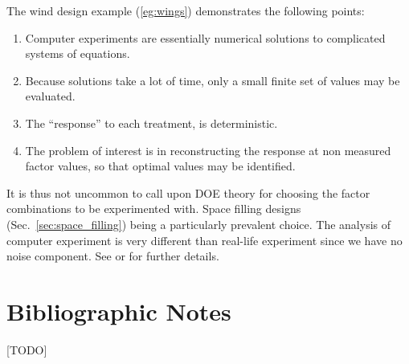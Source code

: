 The wind design example (\ref{eg:wings}) demonstrates the following points:
\begin{enumerate}
\item Computer experiments are essentially numerical solutions to complicated systems of equations.
\item Because solutions take a lot of time, only a small finite set of values may be evaluated. 
\item The ``response'' to each treatment, is deterministic. 
\item The problem of interest is in reconstructing the response at non measured factor values, so that optimal values may be identified. 
\end{enumerate}
It is thus not uncommon to call upon DOE theory for choosing the factor combinations to be experimented with. Space filling designs (Sec.~\ref{sec:space_filling}) being a particularly prevalent choice. 
The analysis of computer experiment is very different than real-life experiment since we have no noise component. 
See \cite{sacks_design_1989} or \cite{santner_design_2013} for further details. 



\section{Bibliographic Notes}
[TODO]